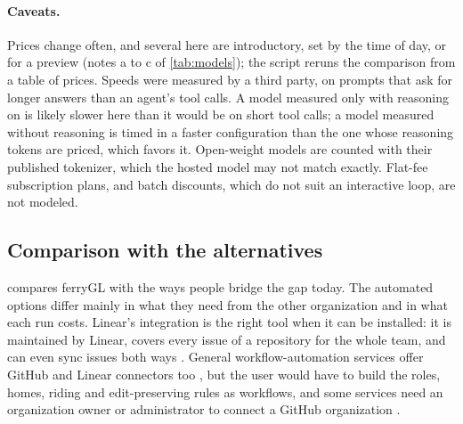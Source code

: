 \documentclass[11pt,a4paper]{article}
\newcommand{\ferry}{ferryGL}
\begin{document}
\paragraph{Caveats.} Prices change often, and several here are introductory, set by the time of
day, or for a preview (notes a to c of \cref{tab:models}); the script reruns the comparison from
a table of prices. Speeds were measured by a third party, on prompts that ask for longer answers
than an agent's tool calls. A model measured only with reasoning on is likely slower here than
it would be on short tool calls; a model measured without reasoning is timed in a faster
configuration than the one whose reasoning tokens are priced, which favors it. Open-weight
models are counted with their published tokenizer, which the hosted model may not match
exactly. Flat-fee subscription plans, and batch discounts, which do not suit an interactive
loop, are not modeled.

\subsection{Comparison with the alternatives}
\label{sec:eval-compare}

 compares \ferry{} with the ways people bridge the gap today. The automated
options differ mainly in what they need from the other organization and in what each run
costs. Linear's integration is the right tool when it can be installed: it is
maintained by Linear, covers every issue of a repository for the whole team, and can even sync
issues both ways \cite{linear2026github}. General workflow-automation services offer GitHub and
Linear connectors too \cite{zapier2026githublinear, make2026githublinear, n8n2026githublinear},
but the user would have to build the roles, homes, riding and edit-preserving rules as
workflows, and some services need an organization owner or administrator to connect a GitHub
organization \cite{unito2026installgithub}.
\end{document}
